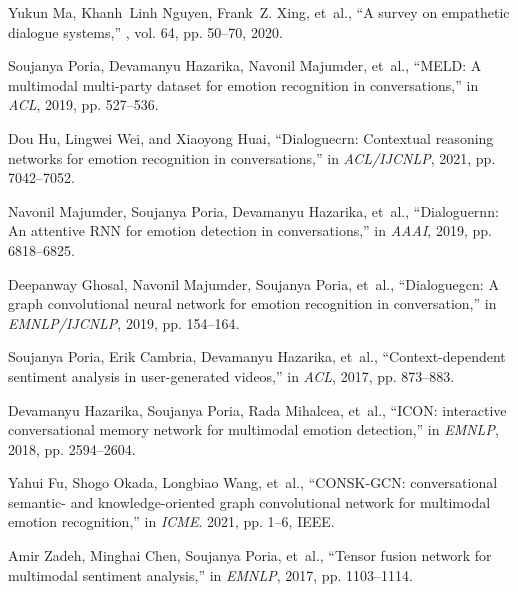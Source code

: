 \documentclass{article}
\begin{document}
\begin{thebibliography}{10}

  Yukun Ma, Khanh~Linh Nguyen, Frank~Z. Xing, et~al.,
  \newblock ``A survey on empathetic dialogue systems,''
  , vol. 64, pp. 50--70, 2020.
  
  Soujanya Poria, Devamanyu Hazarika, Navonil Majumder, et~al.,
  \newblock ``{MELD:} {A} multimodal multi-party dataset for emotion recognition
    in conversations,''
  \newblock in {\em {ACL}}, 2019, pp. 527--536.
  
  Dou Hu, Lingwei Wei, and Xiaoyong Huai,
  \newblock ``Dialoguecrn: Contextual reasoning networks for emotion recognition
    in conversations,''
  \newblock in {\em {ACL/IJCNLP}}, 2021, pp. 7042--7052.
  
  Navonil Majumder, Soujanya Poria, Devamanyu Hazarika, et~al.,
  \newblock ``Dialoguernn: An attentive {RNN} for emotion detection in
    conversations,''
  \newblock in {\em {AAAI}}, 2019, pp. 6818--6825.
  
  Deepanway Ghosal, Navonil Majumder, Soujanya Poria, et~al.,
  \newblock ``Dialoguegcn: {A} graph convolutional neural network for emotion
    recognition in conversation,''
  \newblock in {\em {EMNLP/IJCNLP}}, 2019, pp. 154--164.
  
  Soujanya Poria, Erik Cambria, Devamanyu Hazarika, et~al.,
  \newblock ``Context-dependent sentiment analysis in user-generated videos,''
  \newblock in {\em {ACL}}, 2017, pp. 873--883.
  
  Devamanyu Hazarika, Soujanya Poria, Rada Mihalcea, et~al.,
  \newblock ``{ICON:} interactive conversational memory network for multimodal
    emotion detection,''
  \newblock in {\em {EMNLP}}, 2018, pp. 2594--2604.
  
  Yahui Fu, Shogo Okada, Longbiao Wang, et~al.,
  \newblock ``{CONSK-GCN:} conversational semantic- and knowledge-oriented graph
    convolutional network for multimodal emotion recognition,''
  \newblock in {\em {ICME}}. 2021, pp. 1--6, {IEEE}.
  
  Amir Zadeh, Minghai Chen, Soujanya Poria, et~al.,
  \newblock ``Tensor fusion network for multimodal sentiment analysis,''
  \newblock in {\em {EMNLP}}, 2017, pp. 1103--1114.
  

\end{thebibliography}
\end{document}
